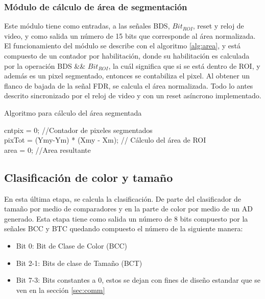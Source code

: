 \documentclass[twoside,spanish,ESP,MSc]{plantillaLabUPV}
\theoremstyle{definition}
\begin{document}
\subsubsection{Módulo de cálculo de área de segmentación} \label{sec:areasgm}

Este módulo tiene como entradas, a las señales BDS, $Bit_{ROI}$, reset y reloj de video, y como salida un número de 15 bits que corresponde al área normalizada. El funcionamiento del módulo se describe con el algoritmo \ref{alg:area}, y está compuesto de un contador por habilitación, donde su habilitación es calculada por la operación BDS \&\& $Bit_{ROI}$, la cuál significa que si se está dentro de ROI, y además es un pixel segmentado, entonces se contabiliza el pixel. Al obtener un flanco de bajada de la señal FDR, se calcula el área normalizada. Todo lo antes descrito sincronizado por el reloj de video y con un reset asíncrono implementado.

\begin{algorithm} %
	\caption{Algoritmo para cálculo del área segmentada}
	\label{alg:area}
	\SetAlgoLined
	
	cntpix = 0; //Contador de pixeles segmentados \\
	pixTot = (Ymy-Ym) * (Xmy - Xm); // Cálculo del área de ROI\\
	area = 0; //Area resultante
	
\end{algorithm}



\subsection{Clasificación de color y tamaño}
En esta última etapa, se calcula la clasificación. De parte del clasificador de tamaño por medio de comparadores y en la parte de color por medio de un AD generado. Esta etapa tiene como salida un número de 8 bits compuesto por la señales BCC y BTC %
quedando compuesto el número de la siguiente manera:

\begin{itemize}
	\item Bit 0: Bit de Clase de Color (BCC)
	\item Bit 2-1: Bits de clase de Tamaño (BCT)
	\item Bit 7-3: Bits constantes a 0, estos se dejan con fines de diseño estandar que se ven en la sección \ref{sec:comm}
\end{itemize}
\end{document}
